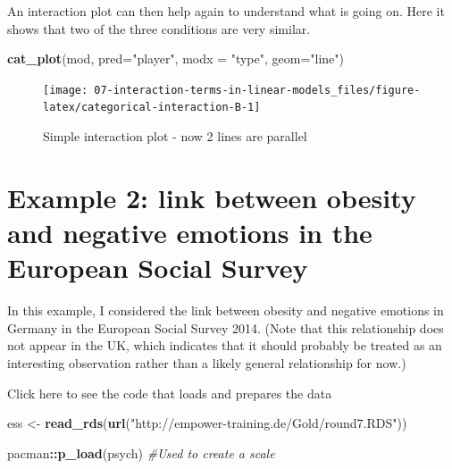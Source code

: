 \documentclass[
]{book}
\newenvironment{Shaded}{\begin{snugshade}}{\end{snugshade}}
\newcommand{\CommentTok}[1]{\textcolor[rgb]{0.56,0.35,0.01}{\textit{#1}}}
\newcommand{\DataTypeTok}[1]{\textcolor[rgb]{0.13,0.29,0.53}{#1}}
\newcommand{\KeywordTok}[1]{\textcolor[rgb]{0.13,0.29,0.53}{\textbf{#1}}}
\newcommand{\NormalTok}[1]{#1}
\newcommand{\OperatorTok}[1]{\textcolor[rgb]{0.81,0.36,0.00}{\textbf{#1}}}
\newcommand{\StringTok}[1]{\textcolor[rgb]{0.31,0.60,0.02}{#1}}
\begin{document}
An interaction plot can then help again to understand what is going on. Here it shows that two of the three conditions are very similar.

\begin{Shaded}
\begin{Highlighting}[]
\KeywordTok{cat_plot}\NormalTok{(mod, }\DataTypeTok{pred=}\StringTok{"player"}\NormalTok{, }\DataTypeTok{modx =} \StringTok{"type"}\NormalTok{, }\DataTypeTok{geom=}\StringTok{"line"}\NormalTok{)}
\end{Highlighting}
\end{Shaded}

\begin{figure}

{\centering \texttt{[image: 07-interaction-terms-in-linear-models\_files/figure-latex/categorical-interaction-B-1]} 

}

\caption{Simple interaction plot - now 2 lines are parallel}\label{fig:categorical-interaction-B}
\end{figure}

\hypertarget{example-2-link-between-obesity-and-negative-emotions-in-the-european-social-survey}{%
\section{Example 2: link between obesity and negative emotions in the European Social Survey}\label{example-2-link-between-obesity-and-negative-emotions-in-the-european-social-survey}}

In this example, I considered the link between obesity and negative emotions in Germany in the European Social Survey 2014. (Note that this relationship does not appear in the UK, which indicates that it should probably be treated as an interesting observation rather than a likely general relationship for now.)

Click here to see the code that loads and prepares the data

\begin{Shaded}
\begin{Highlighting}[]
\NormalTok{ess <-}\StringTok{ }\KeywordTok{read_rds}\NormalTok{(}\KeywordTok{url}\NormalTok{(}\StringTok{"http://empower-training.de/Gold/round7.RDS"}\NormalTok{))}

\NormalTok{pacman}\OperatorTok{::}\KeywordTok{p_load}\NormalTok{(psych) }\CommentTok{#Used to create a scale}
\end{Highlighting}
\end{Shaded}
\end{document}
